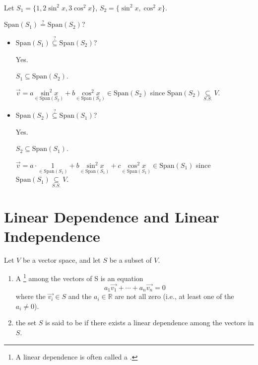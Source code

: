 \documentclass[11pt,fleqn]{book} %
\begin{document}
\begin{example}
{~~~}
    
    Let $S_1=\{ 1, 2\sin^2{x}, 3\cos^2{x} \}$, $S_2 = \{ \sin^2{x}, \cos^2{x} \}$. 
    
    $\mathrm{Span}(S_1) \overset{?}= \mathrm{Span}(S_2)$? 
    
    \begin{itemize}
        \item $\mathrm{Span}\left( S_1 \right) \overset{?}{\subseteq} \mathrm{Span}\left( S_2 \right)$? 
        
        {\color{lightblue} Yes. 
        
        $S_1 \subseteq \mathrm{Span}\left( S_2 \right)$. 
        
        $\overrightarrow{v} = a\underset{\in \mathrm{Span}\left( S_2 \right)}{\sin^2x}+b\underset{\in\mathrm{Span}\left( S_2 \right)}{\cos^2x} \in \mathrm{Span}\left( S_2 \right)$ since $\mathrm{Span}\left( S_2 \right) \underset{S.S.}{\subseteq} V$. }
        
        \item $\mathrm{Span}\left( S_2 \right) \overset{?}{\subseteq} \mathrm{Span}\left( S_1 \right)$? 
        
        {\color{lightblue} Yes. 
        
        $S_2 \subseteq \mathrm{Span}\left( S_1 \right)$. 
        
        $\overrightarrow{v} = a \cdot \underset{\in\mathrm{Span}\left( S_1 \right)}{1} + b \underset{\in \mathrm{Span}\left( S_1 \right)}{\sin^2x} + c \underset{\in\mathrm{Span}\left( S_1 \right)}{\cos^2x} \in \mathrm{Span}\left( S_1 \right)$ since $\mathrm{Span}\left( S_1 \right) \underset{S.S.}{\subseteq} V$. }

    \end{itemize}
\end{example}

\section{Linear Dependence and Linear Independence}

\setcounter{section}{4}
\setcounter{definitionT}{1}
\begin{definition}
    Let $V$ be a vector space, and let $S$ be a subset of $V$.
    
    \begin{enumerate}[label=\alph*)]
        \item A \footnote{A linear dependence is often called a . } among the vectors of S is an equation $$a_1\overrightarrow{v_1} + \cdots + a_n\overrightarrow{v_n} = 0$$ where the $\overrightarrow{v_i} \in S$ and the $a_i \in \mathbb{R}$ are not all zero (i.e., at least one of the $a_i \neq 0$).

        \item the set $S$ is said to be  if there exists a linear dependence among the vectors in $S$.
    \end{enumerate} 
\end{definition}
\setcounter{section}{5}
\end{document}
